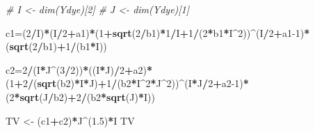 \documentclass[
]{article}
\newenvironment{Shaded}{\begin{snugshade}}{\end{snugshade}}
\newcommand{\CommentTok}[1]{\textcolor[rgb]{0.56,0.35,0.01}{\textit{#1}}}
\newcommand{\DecValTok}[1]{\textcolor[rgb]{0.00,0.00,0.81}{#1}}
\newcommand{\FloatTok}[1]{\textcolor[rgb]{0.00,0.00,0.81}{#1}}
\newcommand{\FunctionTok}[1]{\textcolor[rgb]{0.13,0.29,0.53}{\textbf{#1}}}
\newcommand{\NormalTok}[1]{#1}
\newcommand{\OtherTok}[1]{\textcolor[rgb]{0.56,0.35,0.01}{#1}}
\newcommand{\SpecialCharTok}[1]{\textcolor[rgb]{0.81,0.36,0.00}{\textbf{#1}}}
\begin{document}
\begin{Shaded}
\begin{Highlighting}[]
\CommentTok{\# I \textless{}{-} dim(Ydye)[2]}
\CommentTok{\# J \textless{}{-} dim(Ydye)[1]}

\NormalTok{c1}\OtherTok{=}\NormalTok{(}\DecValTok{2}\SpecialCharTok{/}\NormalTok{I)}\SpecialCharTok{*}\NormalTok{(I}\SpecialCharTok{/}\DecValTok{2}\SpecialCharTok{+}\NormalTok{a1)}\SpecialCharTok{*}\NormalTok{(}\DecValTok{1}\SpecialCharTok{+}\FunctionTok{sqrt}\NormalTok{(}\DecValTok{2}\SpecialCharTok{/}\NormalTok{b1)}\SpecialCharTok{*}\DecValTok{1}\SpecialCharTok{/}\NormalTok{I}\SpecialCharTok{+}\DecValTok{1}\SpecialCharTok{/}\NormalTok{(}\DecValTok{2}\SpecialCharTok{*}\NormalTok{b1}\SpecialCharTok{*}\NormalTok{I}\SpecialCharTok{\^{}}\DecValTok{2}\NormalTok{))}\SpecialCharTok{\^{}}\NormalTok{(I}\SpecialCharTok{/}\DecValTok{2}\SpecialCharTok{+}\NormalTok{a1}\DecValTok{{-}1}\NormalTok{)}\SpecialCharTok{*}\NormalTok{(}\FunctionTok{sqrt}\NormalTok{(}\DecValTok{2}\SpecialCharTok{/}\NormalTok{b1)}\SpecialCharTok{+}\DecValTok{1}\SpecialCharTok{/}\NormalTok{(b1}\SpecialCharTok{*}\NormalTok{I))}

\NormalTok{c2}\OtherTok{=}\DecValTok{2}\SpecialCharTok{/}\NormalTok{(I}\SpecialCharTok{*}\NormalTok{J}\SpecialCharTok{\^{}}\NormalTok{(}\DecValTok{3}\SpecialCharTok{/}\DecValTok{2}\NormalTok{))}\SpecialCharTok{*}\NormalTok{((I}\SpecialCharTok{*}\NormalTok{J)}\SpecialCharTok{/}\DecValTok{2}\SpecialCharTok{+}\NormalTok{a2)}\SpecialCharTok{*}\NormalTok{(}\DecValTok{1}\SpecialCharTok{+}\DecValTok{2}\SpecialCharTok{/}\NormalTok{(}\FunctionTok{sqrt}\NormalTok{(b2)}\SpecialCharTok{*}\NormalTok{I}\SpecialCharTok{*}\NormalTok{J)}\SpecialCharTok{+}\DecValTok{1}\SpecialCharTok{/}\NormalTok{(b2}\SpecialCharTok{*}\NormalTok{I}\SpecialCharTok{\^{}}\DecValTok{2}\SpecialCharTok{*}\NormalTok{J}\SpecialCharTok{\^{}}\DecValTok{2}\NormalTok{))}\SpecialCharTok{\^{}}\NormalTok{(I}\SpecialCharTok{*}\NormalTok{J}\SpecialCharTok{/}\DecValTok{2}\SpecialCharTok{+}\NormalTok{a2}\DecValTok{{-}1}\NormalTok{)}\SpecialCharTok{*}\NormalTok{(}\DecValTok{2}\SpecialCharTok{*}\FunctionTok{sqrt}\NormalTok{(J}\SpecialCharTok{/}\NormalTok{b2)}\SpecialCharTok{+}\DecValTok{2}\SpecialCharTok{/}\NormalTok{(b2}\SpecialCharTok{*}\FunctionTok{sqrt}\NormalTok{(J)}\SpecialCharTok{*}\NormalTok{I))}

\NormalTok{TV }\OtherTok{\textless{}{-}}\NormalTok{ (c1}\SpecialCharTok{+}\NormalTok{c2)}\SpecialCharTok{*}\NormalTok{J}\SpecialCharTok{\^{}}\NormalTok{(}\FloatTok{1.5}\NormalTok{)}\SpecialCharTok{*}\NormalTok{I}
\NormalTok{TV}
\end{Highlighting}
\end{Shaded}
\end{document}
